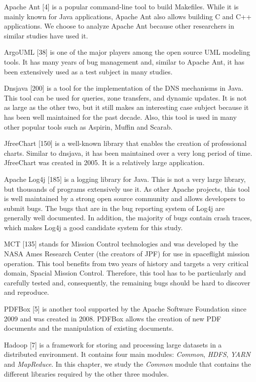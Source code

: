 \documentclass[12pt]{report}
\begin{document}
Apache Ant {[}4{]} is a popular command-line tool to build Makefiles.
While it is mainly known for Java applications, Apache Ant also allows
building C and C++ applications. We choose to analyze Apache Ant because
other researchers in similar studies have used it.

ArgoUML {[}38{]} is one of the major players among the open source UML
modeling tools. It has many years of bug management and, similar to
Apache Ant, it has been extensively used as a test subject in many
studies.

Dnsjava {[}200{]} is a tool for the implementation of the DNS mechanisms
in Java. This tool can be used for queries, zone transfers, and dynamic
updates. It is not as large as the other two, but it still makes an
interesting case subject because it has been well maintained for the
past decade. Also, this tool is used in many other popular tools such as
Aspirin, Muffin and Scarab.

JfreeChart {[}150{]} is a well-known library that enables the creation
of professional charts. Similar to dnsjava, it has been maintained over
a very long period of time. JfreeChart was created in 2005. It is a
relatively large application.

Apache Log4j {[}185{]} is a logging library for Java. This is not a very
large library, but thousands of programs extensively use it. As other
Apache projects, this tool is well maintained by a strong open source
community and allows developers to submit bugs. The bugs that are in the
bug reporting system of Log4j are generally well documented. In
addition, the majority of bugs contain crash traces, which makes Log4j a
good candidate system for this study.

MCT {[}135{]} stands for Mission Control technologies and was developed
by the NASA Ames Research Center (the creators of JPF) for use in
spaceflight mission operation. This tool benefits from two years of
history and targets a very critical domain, Spacial Mission Control.
Therefore, this tool has to be particularly and carefully tested and,
consequently, the remaining bugs should be hard to discover and
reproduce.

PDFBox {[}5{]} is another tool supported by the Apache Software
Foundation since 2009 and was created in 2008. PDFBox allows the
creation of new PDF documents and the manipulation of existing
documents.

Hadoop {[}7{]} is a framework for storing and processing large datasets
in a distributed environment. It contains four main modules:
\emph{Common}, \emph{HDFS}, \emph{YARN} and \emph{MapReduce}. In this
chapter, we study the \emph{Common} module that contains the different
libraries required by the other three modules.
\end{document}
